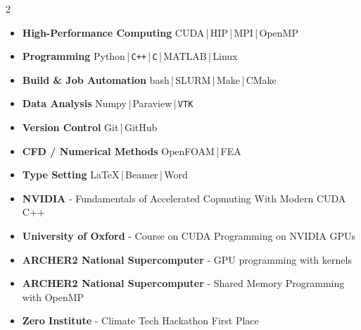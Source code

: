 \documentclass{cv}
\begin{document}
{
\vspace{-1em}
\begin{multicols}{2}
\begin{itemize}[topsep=0pt, itemsep=1pt]
	\item[\cvbodysz\faBolt] \cvbodysz \textbf{High-Performance Computing} {CUDA}\,|\,{HIP}\,|\,{MPI}\,|\,{OpenMP}
	\item[\cvbodysz\faCode] \cvbodysz \textbf{Programming} Python\,|\,\texttt{C++}\,|\,\texttt{C}\,|\,MATLAB\,|\,Linux
	\item[\cvbodysz\faHammer] \cvbodysz \textbf{Build \& Job Automation} {bash}\,|\,{SLURM}\,|\,{Make}\,|\,{CMake}
	\item[\cvbodysz\faSlidersH] \cvbodysz \textbf{Data Analysis} Numpy\,|\,Paraview\,|\,\texttt{VTK}
	\item[\cvbodysz\faGit*] \cvbodysz \textbf{Version Control} {Git}\,|\,GitHub
	\item[\cvbodysz\faTint] \cvbodysz \textbf{CFD / Numerical Methods} OpenFOAM\,|\,FEA
	\item[\cvbodysz\faTextHeight] \cvbodysz \textbf{Type Setting} \LaTeX\,|\,Beamer\,|\,Word
\end{itemize}
\end{multicols}
}

\vspace{-1em}
\begin{itemize}
	\item \textbf{NVIDIA} - Fundamentals of Accelerated Copmuting With Modern CUDA C++
	\item \textbf{University of Oxford} - Course on CUDA Programming on NVIDIA GPUs
	\item \textbf{ARCHER2 National Supercomputer} - GPU programming with kernels
	\item \textbf{ARCHER2 National Supercomputer} - Shared Memory Programming with OpenMP
	\item \textbf{Zero Institute} - Climate Tech Hackathon First Place
\end{itemize}
\end{document}
